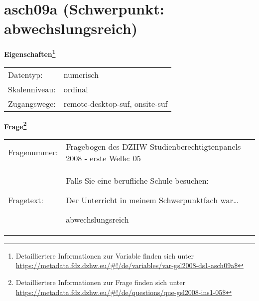 
    \setcounter{footnote}{0}

    \vspace*{-1.8cm}
	\section{asch09a (Schwerpunkt: abwechslungsreich)}
	\label{section:asch09a}



    \vspace*{0.5cm}
    \noindent\textbf{Eigenschaften\footnote{Detailliertere Informationen zur Variable finden sich unter
		\url{https://metadata.fdz.dzhw.eu/\#!/de/variables/var-gsl2008-ds1-asch09a$}}}\\
	\begin{tabularx}{\hsize}{@{}lX}
	Datentyp: & numerisch \\
	Skalenniveau: & ordinal \\
	Zugangswege: &
	  remote-desktop-suf, 
	  onsite-suf
 \\
    \end{tabularx}



				\vspace*{0.5cm}
                \noindent\textbf{Frage\footnote{Detailliertere Informationen zur Frage finden sich unter
		              \url{https://metadata.fdz.dzhw.eu/\#!/de/questions/que-gsl2008-ins1-05$}}}\\
				\begin{tabularx}{\hsize}{@{}lX}
					Fragenummer: &
					  Fragebogen des DZHW-Studienberechtigtenpanels 2008 - erste Welle:
					  05
 \\
					Fragetext: & Falls Sie eine berufliche Schule besuchen:\par  Der Unterricht in meinem Schwerpunktfach war…\par  abwechslungsreich \\
				\end{tabularx}






